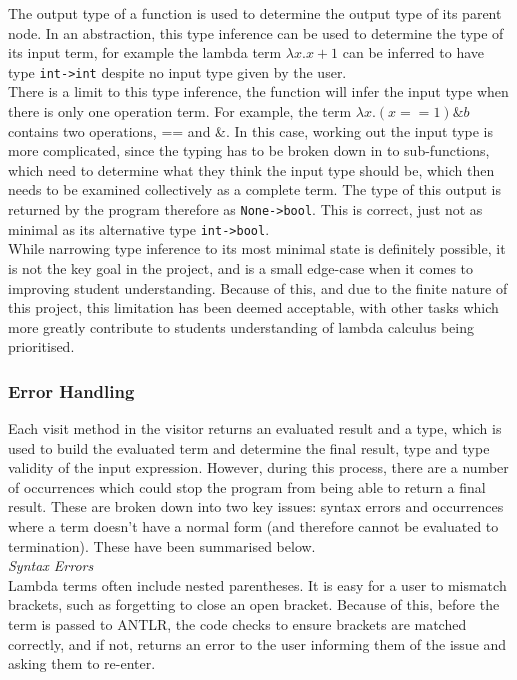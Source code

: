 \documentclass[a4paper,11pt]{report}
\begin{document}
The output type of a function is used to determine the output type of its parent node. In an abstraction, this type inference can be used to determine the type of its input term, for example the lambda term $\lambda x.x+1$ can be inferred to have type \texttt{int->int} despite no input type given by the user.\\

There is a limit to this type inference, the function will infer the input type when there is only one operation term. For example, the term $\lambda x.(x==1)\&b$ contains two operations, == and \&. In this case, working out the input type is more complicated, since the typing has to be broken down in to sub-functions, which need to determine what they think the input type should be, which then needs to be examined collectively as a complete term. The type of this output is returned by the program therefore as \texttt{None->bool}. This is correct, just not as minimal as its alternative type \texttt{int->bool}.\\

While narrowing type inference to its most minimal state is definitely possible, it is not the key goal in the project, and is a small edge-case when it comes to improving student understanding. Because of this, and due to the finite nature of this project, this limitation has been deemed acceptable, with other tasks which more greatly contribute to students understanding of lambda calculus being prioritised.

\subsubsection{Error Handling}
Each visit method in the visitor returns an evaluated result and a type, which is used to build the evaluated term and determine the final result, type and type validity of the input expression. However, during this process, there are a number of occurrences which could stop the program from being able to return a final result. These are broken down into two key issues: syntax errors and occurrences where a term doesn't have a normal form (and therefore cannot be evaluated to termination). These have been summarised below.\\

\textit{Syntax Errors}\\
Lambda terms often include nested parentheses. It is easy for a user to mismatch brackets, such as forgetting to close an open bracket. Because of this, before the term is passed to ANTLR, the code checks to ensure brackets are matched correctly, and if not, returns an error to the user informing them of the issue and asking them to re-enter.
\end{document}
